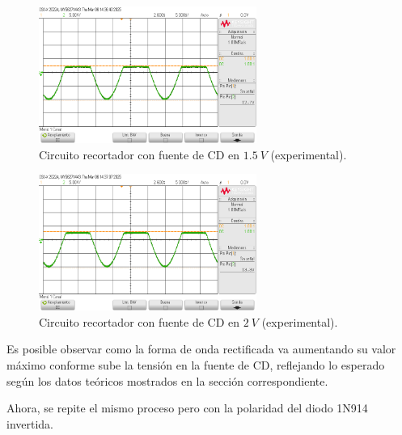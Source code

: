 \documentclass[journal]{IEEEtran}
\begin{document}
\begin{figure}[H]
        \centering
        \includegraphics[width=2.8in]{SignalExperimental_09.png}
        \caption{Circuito recortador con fuente de CD en $1.5~V$ (experimental).}
        \label{fig:SignalExperimental_09}
\end{figure}
\begin{figure}[H]
        \centering
        \includegraphics[width=2.8in]{SignalExperimental_10.png}
        \caption{Circuito recortador con fuente de CD en $2~V$ (experimental).}
        \label{fig:SignalExperimental_10}
\end{figure}

Es posible observar como la forma de onda rectificada va aumentando su valor máximo conforme sube la tensión en la fuente de CD,
reflejando lo esperado según los datos teóricos mostrados en la sección correspondiente. 

Ahora, se repite el mismo proceso pero con la polaridad del diodo 1N914 invertida. 
\end{document}
